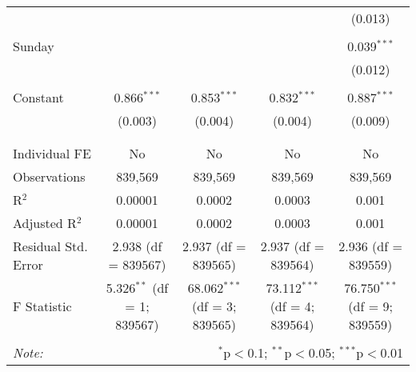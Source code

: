 \documentclass[
]{article}
\begin{document}
\begin{table}[!htbp]
{\begin{tabular}{@{\extracolsep{5pt}}lcccc}
  &  &  &  & (0.013) \\ 
  & & & & \\ 
 Sunday &  &  &  & 0.039$^{***}$ \\ 
  &  &  &  & (0.012) \\ 
  & & & & \\ 
 Constant & 0.866$^{***}$ & 0.853$^{***}$ & 0.832$^{***}$ & 0.887$^{***}$ \\ 
  & (0.003) & (0.004) & (0.004) & (0.009) \\ 
  & & & & \\ 
\hline \\[-1.8ex] 
Individual FE & No & No & No & No \\ 
Observations & 839,569 & 839,569 & 839,569 & 839,569 \\ 
R$^{2}$ & 0.00001 & 0.0002 & 0.0003 & 0.001 \\ 
Adjusted R$^{2}$ & 0.00001 & 0.0002 & 0.0003 & 0.001 \\ 
Residual Std. Error & 2.938 (df = 839567) & 2.937 (df = 839565) & 2.937 (df = 839564) & 2.936 (df = 839559) \\ 
F Statistic & 5.326$^{**}$ (df = 1; 839567) & 68.062$^{***}$ (df = 3; 839565) & 73.112$^{***}$ (df = 4; 839564) & 76.750$^{***}$ (df = 9; 839559) \\ 
\hline 
\hline \\[-1.8ex] 
\textit{Note:}  & \multicolumn{4}{r}{$^{*}$p$<$0.1; $^{**}$p$<$0.05; $^{***}$p$<$0.01} \\ 
\end{tabular}
} 
\end{table} 
\newpage
\end{document}
